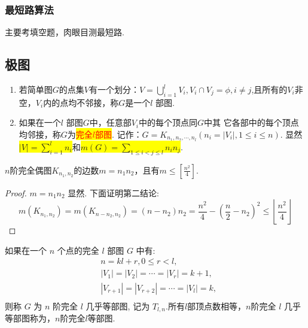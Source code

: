 \subsubsection{最短路算法}
\begin{note}
	主要考填空题，肉眼目测最短路.
\end{note}

\subsection{极图}
\begin{definition}
	\begin{enumerate}
		\item 若简单图$G$的点集$V$有一个划分：$V=\bigcup\limits_{i=1}^{l} V_{i}, V_{i} \cap V_{j}=\phi, i \neq j$,且所有的$V_i$非空，$V_i$内的点均不邻接，称$G$是一个$l$ 部图.
		\item 如果在一个$l$ 部图$G$中，任意部$V_i$中的每个顶点同$G$中其
		它各部中的每个顶点均邻接，称$G$为\colorbox{yellow}{\textcolor{red}{完全$l$部图}}. 记作：$G=K_{n_1,n_2,\cdots,n_l}(n_i=|V_i|, 1\leq i \leq  n)$. 显然\colorbox{yellow}{$|V|=\sum\limits_{i=1}^{l}n_i$}和\colorbox{yellow}{$m(G)=\sum\limits_{1\leq i < j \leq l}n_in_j$}.
	\end{enumerate}
\end{definition}

\begin{theorem}
	$n$阶完全偶图$K_{n_1,n_2}$的边数$m=n_1n_2$，且有$m\leq \left[\frac{n^2}{4}\right]$.
\end{theorem}
\begin{proof}
	\( m=n_{1} n_{2} \) 显然. 下面证明第二结论:
	\[
	m\left(K_{n_{1}, n_{2}}\right)=m\left(K_{n-n_{2}, n_{2}}\right)=\left(n-n_{2}\right) n_{2}=\frac{n^{2}}{4}-\left(\frac{n}{2}-n_{2}\right)^{2} \leq\left\lfloor\frac{n^{2}}{4}\right\rfloor
	\]
\end{proof}

\begin{definition}
	如果在一个 \( {n} \) 个点的完全 \( {l} \) 部图 \( {G} \) 中有:
	\[
	\begin{split}
		 &n=k l+r, 0 \leq r<l,\\
		 &\left|V_{1}\right|=\left|V_{2}\right|=\cdots=\left|V_{r}\right|=k+1,\\
		 & \left|V_{r+1}\right|=\left|V_{r+2}\right|=\cdots=\left|V_{l}\right|=k, \\
	\end{split}
	\]
	则称 \( G \) 为 \( n \) 阶完全 \( l \) 几乎等部图, 记为 \( T_{l, n} \).所有$l$部顶点数相等，\( n \)阶完全 \( l \) 几乎等部图称为，\( n \)阶完全\( l \)等部图.
\end{definition}


